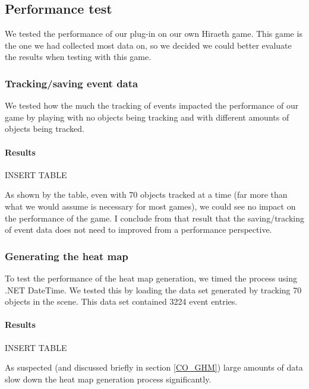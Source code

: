 \subsection{Performance test}
\label{Test_P}
We tested the performance of our plug-in on our own Hiraeth game. This game is the one we had collected most data on, so we decided we could better evaluate the results when testing with this game.

\subsubsection{Tracking/saving event data}
\label{Test_P_Saving}
We tested how the much the tracking of events impacted the performance of our game by playing with no objects being tracking and with different amounts of objects being tracked.

\paragraph{Results}
INSERT TABLE

As shown by the table, even with 70 objects tracked at a time (far more than what we would assume is necessary for most games), we could see no impact on the performance of the game. I conclude from that result that the saving/tracking of event data does not need to improved from a performance perspective.

\subsubsection{Generating the heat map}
\label{Test_P_Generating}
To test the performance of the heat map generation, we timed the process using .NET DateTime. We tested this by loading the data set generated by tracking 70 objects in the scene. This data set contained 3224 event entries.

\paragraph{Results}
INSERT TABLE

As suspected (and discussed briefly in section \ref{CO_GHM}) large amounts of data slow down the heat map generation process significantly. 
